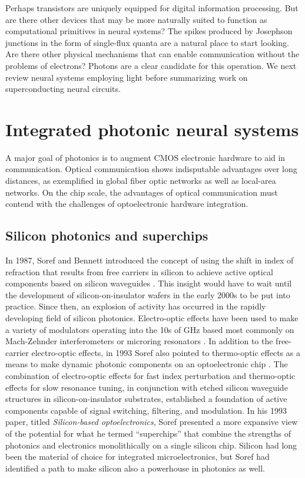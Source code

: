 \documentclass[twocolumn]{article}
\begin{document}
Perhaps transistors are uniquely equipped for digital information processing. But are there other devices that may be more naturally suited to function as computational primitives in neural systems? The spikes produced by Josephson junctions in the form of single-flux quanta are a natural place to start looking. Are there other physical mechanisms that can enable communication without the problems of electrons? Photons are a clear candidate for this operation. We next review neural systems employing light before summarizing work on superconducting neural circuits.

\section{\label{sec:integratedPhotonics}Integrated photonic neural systems}
A major goal of photonics is to augment CMOS electronic hardware to aid in communication. Optical communication shows indisputable advantages over long distances, as exemplified in global fiber optic networks as well as local-area networks. On the chip scale, the advantages of optical communication must contend with the challenges of optoelectronic hardware integration. 

\subsection{Silicon photonics and superchips}
In 1987, Soref and Bennett introduced the concept of using the shift in index of refraction that results from free carriers in silicon to achieve active optical components based on silicon waveguides \cite{sobe1987}. This insight would have to wait until the development of silicon-on-insulator wafers in the early 2000s to be put into practice. Since then, an explosion of activity has occurred in the rapidly developing field of silicon photonics. Electro-optic effects have been used to make a variety of modulators \cite{rema2010} operating into the 10s of GHz based most commonly on Mach-Zehnder interferometers \cite{lisa2005} or microring resonators \cite{xuma2007}. In addition to the free-carrier electro-optic effects, in 1993 Soref also pointed to thermo-optic effects as a means to make dynamic photonic components on an optoelectronic chip \cite{so1993}. The combination of electro-optic effects for fast index perturbation and thermo-optic effects for slow resonance tuning, in conjunction with etched silicon waveguide structures in silicon-on-insulator substrates, established a foundation of active components capable of signal switching, filtering, and modulation. In his 1993 paper, titled \textit{Silicon-based optoelectronics}, Soref presented a more expansive view of the potential for what he termed ``superchips'' that combine the strengths of photonics and electronics monolithically on a single silicon chip. Silicon had long been the material of choice for integrated microelectronics, but Soref had identified a path to make silicon also a powerhouse in photonics as well.
\end{document}
